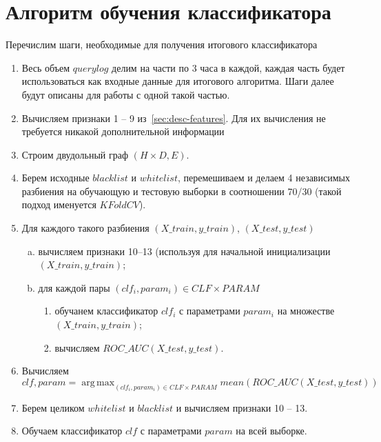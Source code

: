 \documentclass[a4paper,14pt]{extreport} %
\DeclareMathOperator*{\argmaxA}{arg\,max}
\begin{document}
\section{Алгоритм обучения классификатора}
Перечислим шаги, необходимые для получения итогового классификатора
\begin{enumerate}
	\item Весь объем $querylog$ делим на части по 3 часа в каждой, каждая часть будет использоваться как входные данные для итогового алгоритма. Шаги далее будут описаны для работы с одной такой частью.
	      	      	
	\item Вычисляем признаки 1 -- 9 из~\ref{sec:desc-features}. Для их вычисления не требуется никакой дополнительной информации
	      	      	
	\item Строим двудольный граф $(H \times D, E)$.
	      	      	
	\item Берем исходные $blacklist$ и $whitelist$, перемешиваем и делаем 4 независимых разбиения на обучающую и тестовую выборки в соотношении 70/30 
	      (такой подход именуется $KFold CV$).
	      	      	
	\item Для каждого такого разбиения $(X\_train, y\_train)$, $(X\_test, y\_test)$
	      \begin{enumerate}[a)]
	      	\item вычисляем признаки 10--13 (используя для начальной инициализации $(X\_train, y\_train)$;
	      	\item для каждой пары $(clf_i, param_i) \in CLF\times PARAM$
	      	      \begin{enumerate}[-]
	      	      	\item обучанем классификатор $clf_i$ с параметрами $param_i$ на множестве $(X\_train, y\_train)$;
	      	      	\item вычисляем $ROC\_AUC(X\_test, y\_test)$.
	      	      \end{enumerate}
	      	      	      	      	
	      \end{enumerate}
	      	      	
	\item Вычисляем
	      \begin{equation}
	      	\label{eq:clf-opt}
	      	clf, param = \argmaxA_{(clf_i, param_i) \in CLF\times PARAM}mean(ROC\_AUC(X\_test, y\_test))
	      \end{equation}
	\item Берем целиком $whitelist$ и $blacklist$ и вычисляем признаки 10 -- 13.
	\item Обучаем классификатор $clf$ с параметрами $param$ на всей выборке.
\end{enumerate}
	
\end{document}
